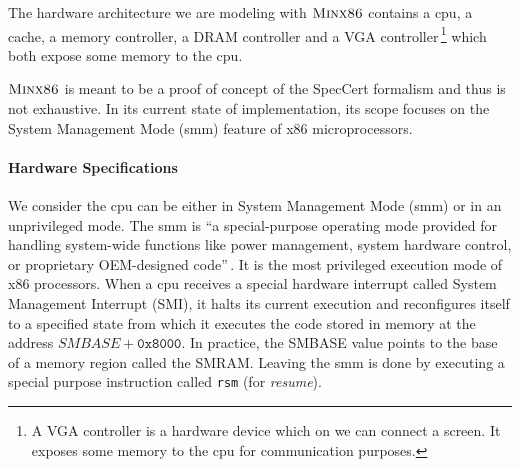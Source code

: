 The hardware architecture we are modeling with $\textsc{Minx86}$ contains a
\ac{cpu}, a cache, a memory controller, a DRAM controller and a VGA
controller\,\footnote{A VGA controller is a hardware device which on we can
  connect a screen. It exposes some memory to the \ac{cpu} for communication
  purposes.} which both expose some memory to the \ac{cpu}.

$\textsc{Minx86}$ is meant to be a proof of concept of the SpecCert formalism
and thus is not exhaustive.
%
In its current state of implementation, its scope focuses on the System
Management Mode (\ac{smm}) feature of x86 microprocessors.

\paragraph{Hardware Specifications}
%
We consider the \ac{cpu} can be either in System Management Mode (\ac{smm}) or
in an unprivileged mode.
%
The \ac{smm} is ``a special-purpose operating mode provided for handling
system-wide functions like power management, system hardware control, or
proprietary OEM-designed code''\,\cite{intel2014manual}.
%
It is the most privileged execution mode of x86 processors.
%
When a \ac{cpu} receives a special hardware interrupt called System Management
Interrupt (SMI), it halts its current execution and reconfigures itself to a
specified state from which it executes the code stored in memory at the address
$SMBASE + \texttt{0x8000}$.
%
In practice, the SMBASE value points to the base of a memory region called the
SMRAM.
%
Leaving the \ac{smm} is done by executing a special purpose instruction called
\texttt{rsm} (for \emph{resume}).

